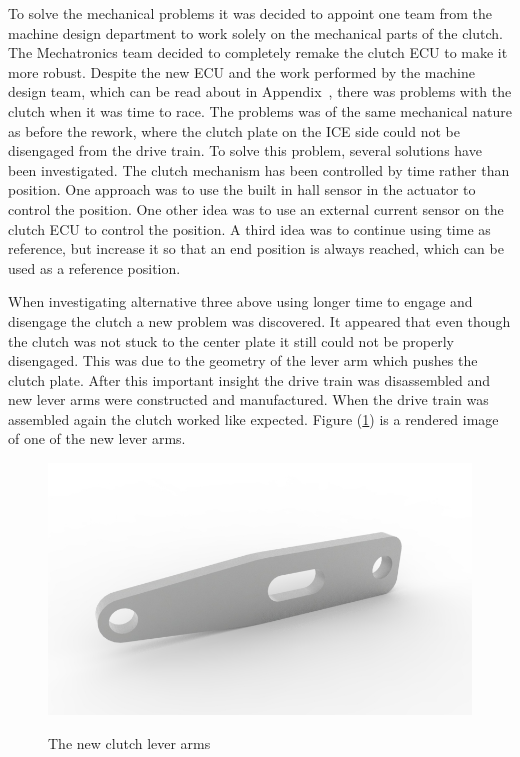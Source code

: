 To solve the mechanical problems it was decided to appoint one team from the
machine design department to work solely on the mechanical parts of the clutch.
The Mechatronics team decided to completely remake the clutch ECU to make it
more robust. Despite the new ECU and the work performed by the machine design
team, which can be read about in Appendix~\cite{MD_report}, there was problems
with the clutch when it was time to race. The problems was of the same
mechanical nature as before the rework, where the clutch plate on the ICE side
could not be disengaged from the drive train. To solve this problem, several
solutions have been investigated. The clutch mechanism has been controlled by
time rather than position. One approach was to use the built in hall sensor in
the actuator to control the position. One other idea was to use an external
current sensor on the clutch ECU to control the position. A third idea was to
continue using time as reference, but increase it so that an end position is
always reached, which can be used as a reference position.

When investigating alternative three above using longer time to engage and
disengage the clutch a new problem was discovered. It appeared that even though
the clutch was not stuck to the center plate it still could not be properly
disengaged. This was due to the geometry of the lever arm which pushes the
clutch plate.  After this important insight the drive train was disassembled and
new lever arms were constructed and manufactured. When the drive train was
assembled again the clutch worked like expected. Figure (\ref{fig:clutch}) is a
rendered image of one of the new lever arms.
\begin{figure}[H]
    \centering\label{fig:clutch}
    \includegraphics[width=1\textwidth]{./img/clutch}
    \caption{The new clutch lever arms}
\end{figure}
